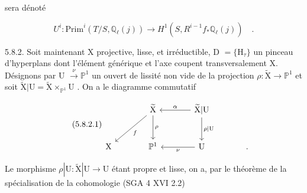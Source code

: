 sera dénoté

\begin{equation}\tag{5.8.1.6}
U^i : \mathrm{Prim}^i(T/S,\mathbb{Q}_\ell(j)) \longrightarrow H^1(S,R^{i-1}f_*\mathbb{Q}_\ell(j)) \quad .
\end{equation}

5.8.2. Soit maintenant X projective, lisse, et irréductible, D $= \{\mathrm{H}_\tau\}$ un pinceau d'hyperplans dont l'élément générique et l'axe coupent transversalement X. Désignons par U $\overset{\nu}{\longrightarrow} \mathbb{P}^1$ un ouvert de lissité non vide de la projection $\rho : \widetilde{\mathrm{X}} \longrightarrow \mathbb{P}^1$ et soit $\widetilde{\mathrm{X}}|\mathrm{U} = \widetilde{\mathrm{X}} \times_{\mathbb{P}^1} \mathrm{U}$ . On a le diagramme commutatif

\begin{equation}\tag{5.8.2.1}
\begin{tikzcd}[column sep=large, row sep=large]
{} & \widetilde{\mathrm{X}} \arrow[dl, "f"] \arrow[d, "\rho"] & \widetilde{\mathrm{X}}|\mathrm{U} \arrow[l, "\alpha"'] \arrow[d, "\rho|\mathrm{U}"] \\
\mathrm{X} & \mathbb{P}^1 & \mathrm{U} \arrow[l, "\nu"] & .
\end{tikzcd}
\end{equation}



%
%
%
%
%
Le morphisme $\rho|\mathrm{U} : \widetilde{\mathrm{X}}|\mathrm{U} \longrightarrow \mathrm{U}$ étant propre et lisse, on a, par le théorème de la spécialisation de la cohomologie (SGA 4 XVI 2.2)

